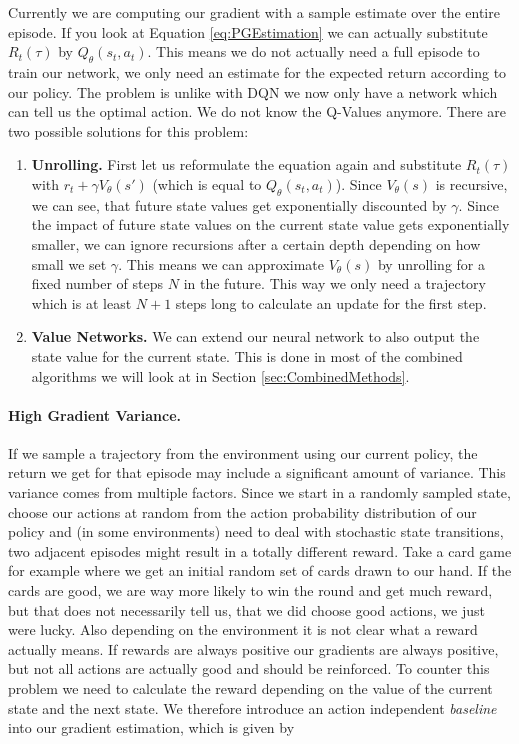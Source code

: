 Currently we are computing our gradient with a sample estimate over the entire episode. If you look at Equation \ref{eq:PGEstimation} we can actually substitute $R_t(\tau)$ by $Q_\theta(s_t, a_t)$. This means we do not actually need a full episode to train our network, we only need an estimate for the expected return according to our policy. The problem is unlike with DQN we now only have a network which can tell us the optimal action. We do not know the Q-Values anymore. There are two possible solutions for this problem:

\begin{enumerate}
  \item \textbf{Unrolling.} First let us reformulate the equation again and substitute $R_t(\tau)$ with $r_t + \gamma V_\theta(s')$ (which is equal to $Q_\theta(s_t, a_t)$). Since $V_\theta(s)$ is recursive, we can see, that future state values get exponentially discounted by $\gamma$. Since the impact of future state values on the current state value gets exponentially smaller, we can ignore recursions after a certain depth depending on how small we set $\gamma$. This means we can approximate $V_\theta(s)$ by unrolling for a fixed number of steps $N$ in the future. This way we only need a trajectory which is at least $N+1$ steps long to calculate an update for the first step. 
  \item \textbf{Value Networks.} We can extend our neural network to also output the state value for the current state. This is done in most of the combined algorithms we will look at in Section \ref{sec:CombinedMethods}.  
\end{enumerate}

\paragraph{High Gradient Variance.}
If we sample a trajectory from the environment using our current policy, the return we get for that episode may include a significant amount of variance. This variance comes from multiple factors. Since we start in a randomly sampled state, choose our actions at random from the action probability distribution of our policy and (in some environments) need to deal with stochastic state transitions, two adjacent episodes might result in a totally different reward. Take a card game for example where we get an initial random set of cards drawn to our hand. If the cards are good, we are way more likely to win the round and get much reward, but that does not necessarily tell us, that we did choose good actions, we just were lucky. Also depending on the environment it is not clear what a reward actually means. If rewards are always positive our gradients are always positive, but not all actions are actually good and should be reinforced. To counter this problem we need to calculate the reward depending on the value of the current state and the next state. We therefore introduce an action independent \textit{baseline} into our gradient estimation, which is given by 

